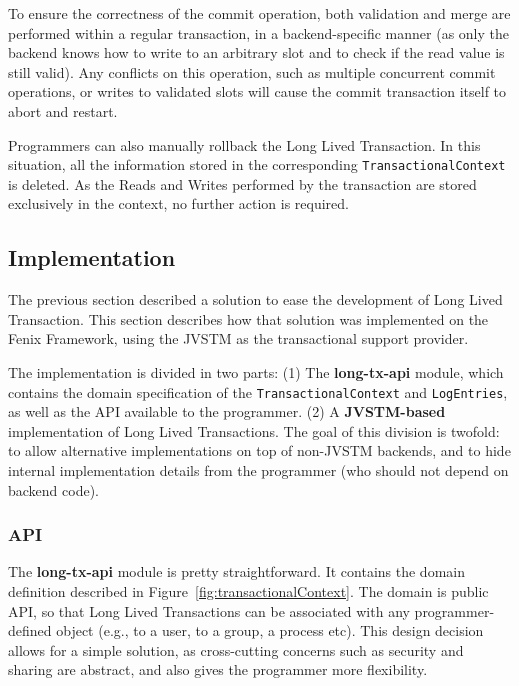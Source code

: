 \documentclass{llncs}
\begin{document}
To ensure the correctness of the commit operation, both validation and
merge are performed within a regular transaction, in a
backend-specific manner (as only the backend knows how to write to an
arbitrary slot and to check if the read value is still valid). Any
conflicts on this operation, such as multiple concurrent commit
operations, or writes to validated slots will cause the commit
transaction itself to abort and restart.

Programmers can also manually rollback the Long Lived Transaction. In
this situation, all the information stored in the corresponding
\texttt{TransactionalContext} is deleted. As the Reads and Writes
performed by the transaction are stored exclusively in the context, no
further action is required.

\subsection{Implementation}
\label{sec:impl}


The previous section described a solution to ease the development of
Long Lived Transaction. This section describes how that solution was
implemented on the Fenix Framework, using the JVSTM as the
transactional support provider.

The implementation is divided in two parts: (1) The {\bf long-tx-api}
module, which contains the domain specification of the
\texttt{TransactionalContext} and \texttt{LogEntries}, as well as the
API available to the programmer. (2) A {\bf JVSTM-based}
implementation of Long Lived Transactions. The goal of this division
is twofold: to allow alternative implementations on top of non-JVSTM
backends, and to hide internal implementation details from the
programmer (who should not depend on backend code).

\subsubsection{API}

The {\bf long-tx-api} module is pretty straightforward. It contains
the domain definition described in
Figure~\ref{fig:transactionalContext}. The domain is public API, so
that Long Lived Transactions can be associated with any
programmer-defined object (e.g., to a user, to a group, a process
etc). This design decision allows for a simple solution, as
cross-cutting concerns such as security and sharing are abstract, and
also gives the programmer more flexibility.
\end{document}
